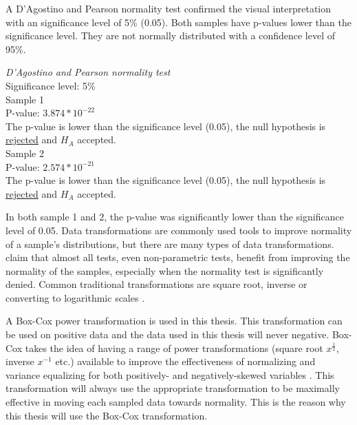 A D'Agostino and Pearson normality test confirmed the visual interpretation with an significance level of 5\% (0.05). Both samples have p-values lower than the significance level. They are not normally distributed with a confidence level of 95\%. \\[0.5cm]

\begin{center}
	\begin{tcolorbox}[width=0.80\textwidth]
		\centering
				\textit{D'Agostino and Pearson normality test}\\
				Significance level: 5\%  \\[0.5cm]
	
				Sample 1\\
				P-value: $3.874 * 10^{-22}$\\
				The p-value is lower than the significance level (0.05), the null hypothesis is \underline{rejected} and $H_A$ accepted.\\[0.5cm]
				
				Sample 2\\
				P-value: $2.574 * 10^{-21}$ \\
				The p-value is lower than the significance level (0.05), the null hypothesis is \underline{rejected} and $H_A$ accepted.\\[0.5cm]
	\end{tcolorbox} 
\end{center}

In both sample 1 and 2, the p-value was significantly lower than the significance level of 0.05. Data transformations are commonly used tools to improve normality of a sample's distributions, but there are many types of data transformations. \cite{Osborne2010} claim that almost all tests, even non-parametric tests, benefit from improving the normality of the samples, especially when the normality test is significantly denied. Common traditional transformations are square root, inverse or converting to logarithmic scales  \citep{Osborne2010}. 

A Box-Cox power transformation is used in this thesis. This transformation can be used on positive data and the data used in this thesis will never negative. Box-Cox takes the idea of having a range of power transformations (square root $x^{\frac{1}{2}}$, inverse $x^{-1}$ etc.) available to improve the effectiveness of normalizing and variance equalizing for both positively- and negatively-skewed variables \citep{Osborne2010}. This transformation will always use the appropriate transformation to be maximally effective in moving each sampled data towards normality. This is the reason why this thesis will use the Box-Cox transformation.

